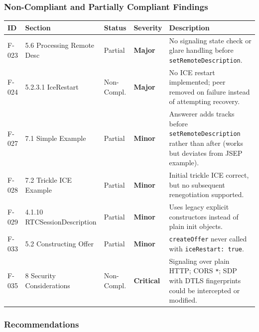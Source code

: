 \documentclass[11pt,letterpaper]{article}
\newcommand{\sevcritical}{\textcolor{critical}{\textbf{Critical}}}
\newcommand{\sevmajor}{\textcolor{major}{\textbf{Major}}}
\newcommand{\sevminor}{\textcolor{minor!80!black}{\textbf{Minor}}}
\begin{document}
\subsubsection{Non-Compliant and Partially Compliant Findings}

\begin{longtable}{C{1cm}L{2.8cm}C{1.5cm}C{1.2cm}L{6.7cm}}
\toprule
\textbf{ID} & \textbf{Section} & \textbf{Status} & \textbf{Severity} & \textbf{Description} \\
\midrule
\endhead
F-023 & 5.6 Processing Remote Desc & Partial & \sevmajor & No signaling state check or glare handling before \texttt{setRemoteDescription}. \\
\midrule
F-024 & 5.2.3.1 IceRestart & Non-Compl. & \sevmajor & No ICE restart implemented; peer removed on failure instead of attempting recovery. \\
\midrule
F-027 & 7.1 Simple Example & Partial & \sevminor & Answerer adds tracks before \texttt{setRemoteDescription} rather than after (works but deviates from JSEP example). \\
\midrule
F-028 & 7.2 Trickle ICE Example & Partial & \sevminor & Initial trickle ICE correct, but no subsequent renegotiation supported. \\
\midrule
F-029 & 4.1.10 RTCSessionDescription & Partial & \sevminor & Uses legacy explicit constructors instead of plain init objects. \\
\midrule
F-033 & 5.2 Constructing Offer & Partial & \sevminor & \texttt{createOffer} never called with \texttt{iceRestart: true}. \\
\midrule
F-035 & 8 Security Considerations & Non-Compl. & \sevcritical & Signaling over plain HTTP; CORS \texttt{*}; SDP with DTLS fingerprints could be intercepted or modified. \\
\bottomrule
\end{longtable}

\subsubsection{Recommendations}
\end{document}
